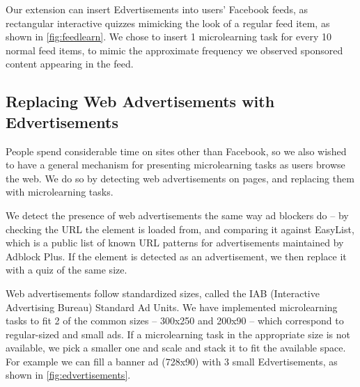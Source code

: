 \documentclass{sigchi}
\begin{document}
Our extension can insert Edvertisements into users' Facebook feeds, as rectangular interactive quizzes mimicking the look of a regular feed item, as shown in \autoref{fig:feedlearn}. We chose to insert 1 microlearning task for every 10 normal feed items, to mimic the approximate frequency we observed sponsored content appearing in the feed.

\subsection{Replacing Web Advertisements with Edvertisements}

People spend considerable time on sites other than Facebook, so we also wished to have a general mechanism for presenting microlearning tasks as users browse the web. We do so by detecting web advertisements on pages, and replacing them with microlearning tasks.

We detect the presence of web advertisements the same way ad blockers do -- by checking the URL the element is loaded from, and comparing it against EasyList, which is a public list of known URL patterns for advertisements maintained by Adblock Plus. If the element is detected as an advertisement, we then replace it with a quiz of the same size.

Web advertisements follow standardized sizes, called the IAB (Interactive Advertising Bureau) Standard Ad Units.
We have implemented microlearning tasks to fit 2 of the common sizes -- 300x250 and 200x90 -- which correspond to regular-sized and small ads.  If a microlearning task in the appropriate size is not available, we pick a smaller one and scale and stack it to fit the available space. For example we can fill a banner ad (728x90) with 3 small Edvertisements, as shown in \autoref{fig:edvertisements}. %



\end{document}
